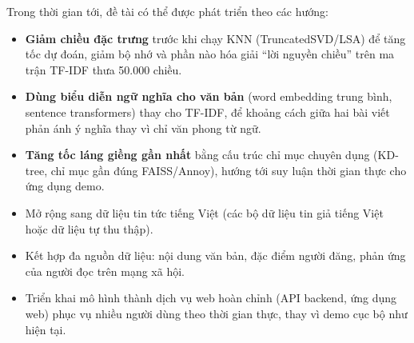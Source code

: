 Trong thời gian tới, đề tài có thể được phát triển theo các hướng:

\begin{itemize}
    \item \textbf{Giảm chiều đặc trưng} trước khi chạy KNN (TruncatedSVD/LSA) để tăng tốc dự đoán, giảm bộ nhớ và phần nào hóa giải ``lời nguyền chiều'' trên ma trận TF-IDF thưa 50.000 chiều.
    \item \textbf{Dùng biểu diễn ngữ nghĩa cho văn bản} (word embedding trung bình, sentence transformers) thay cho TF-IDF, để khoảng cách giữa hai bài viết phản ánh ý nghĩa thay vì chỉ văn phong từ ngữ.
    \item \textbf{Tăng tốc láng giềng gần nhất} bằng cấu trúc chỉ mục chuyên dụng (KD-tree, chỉ mục gần đúng FAISS/Annoy), hướng tới suy luận thời gian thực cho ứng dụng demo.
    \item Mở rộng sang dữ liệu tin tức tiếng Việt (các bộ dữ liệu tin giả tiếng Việt hoặc dữ liệu tự thu thập).
    \item Kết hợp đa nguồn dữ liệu: nội dung văn bản, đặc điểm người đăng, phản ứng của người đọc trên mạng xã hội.
    \item Triển khai mô hình thành dịch vụ web hoàn chỉnh (API backend, ứng dụng web) phục vụ nhiều người dùng theo thời gian thực, thay vì demo cục bộ như hiện tại.
\end{itemize}
